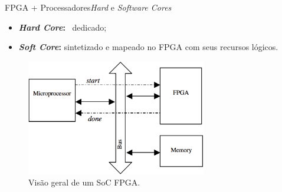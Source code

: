     \begin{frame}{FPGA + Processadores}{\textit{Hard} e \textit{Software Cores} \cite{Plessl2003}} \vspace{-1em} 
    \begin{itemize}
        \setlength{\itemsep}{0.5em}
        \item \textbf{\textit{Hard Core}:} \core\ dedicado;
        \item \textbf{\textit{Soft Core}:} sintetizado e mapeado no FPGA com seus recursos lógicos. 
    \end{itemize}
    
    \begin{figure}[h] \centering
        \vspace{-8pt}
        \includegraphics[width=0.7\textwidth]{img/into-soc.png}
        \caption{Visão geral de um SoC FPGA.}
        \label{fig:rb-soc}
    \end{figure}
    
    \end{frame}
